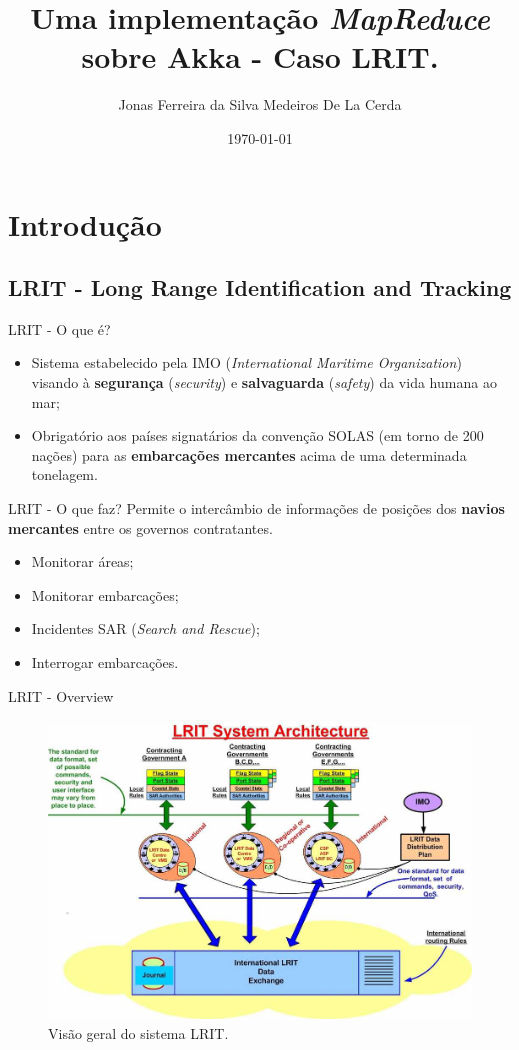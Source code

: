 \documentclass{beamer}
\title[Uma implementação \textit{MapReduce} sobre Akka - Caso LRIT.]{Uma implementação \textit{MapReduce} sobre Akka - Caso LRIT.}
\author[Jonas Ferreira]{Jonas Ferreira da Silva Medeiros De La Cerda}
\date[Dezembro/2015]{\today}
\institute[UFF]{Universidade Federal Fluminense}
\begin{document}
 
 
\titlepage

\section{Introdução}
	\subsection{LRIT - Long Range Identification and Tracking}
		\begin{frame}{LRIT - O que é?}
			\begin{itemize}
				\item Sistema estabelecido pela IMO (\textit{International Maritime Organization}) visando à \textbf{segurança} (\textit{security}) e \textbf{salvaguarda} (\textit{safety}) da vida humana ao mar;
				\item Obrigatório aos países signatários da convenção SOLAS (em torno de 200 nações) para as \textbf{embarcações mercantes} acima de uma determinada tonelagem.
			\end{itemize}
		\end{frame}

		\begin{frame}{LRIT - O que faz?}
		Permite o intercâmbio de informações de posições dos \textbf{navios mercantes} entre os governos contratantes.
			\begin{itemize}
				\item Monitorar áreas;
				\item Monitorar embarcações;
				\item Incidentes SAR (\textit{Search and Rescue});
				\item Interrogar embarcações.
			\end{itemize}
		\end{frame}

		\begin{frame}{LRIT - Overview}
			\begin{figure}[H]
				\includegraphics[scale=0.33]{img/lrit.png}
				\caption{Visão geral do sistema LRIT.}
				\label{fig:overview}
			\end{figure}
		\end{frame}
\end{document}

